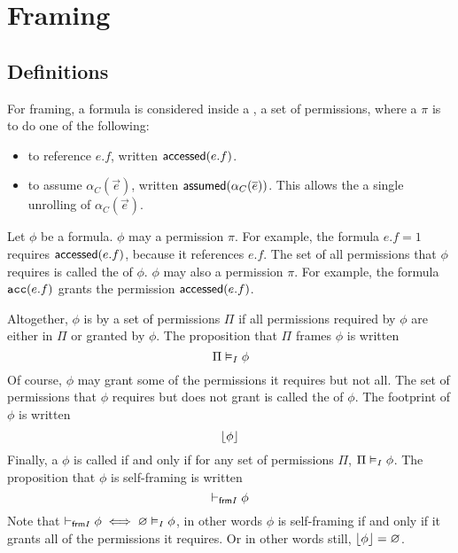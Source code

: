\newpage
\section{Framing}

\subsection{Definitions}

For framing, a formula is considered inside a , a set of permissions, where a  $\pi$ is to do one of the following:
\begin{itemize}
  \item to reference $e.f$, written $\textsf{accessed}(e.f)$.
  \item to assume $\alpha_C(\vec{e})$, written $\textsf{assumed}(\alpha_C(\overline{e}))$. This allows the a single unrolling of $\alpha_C(\vec{e})$.
\end{itemize}
%
Let $\phi$ be a formula.
$\phi$ may  a permission $\pi$. For example, the formula $e.f = 1$ requires $\textsf{accessed}(e.f)$, because it references $e.f$. The set of all permissions that $\phi$ requires is called the  of $\phi$. $\phi$ may also  a permission $\pi$. For example, the formula $\texttt{acc}(e.f)$ grants the permission $\textsf{accessed}(e.f)$.

Altogether, $\phi$ is  by a set of permissions $\Pi$ if all permissions required by $\phi$ are either in $\Pi$ or granted by $\phi$. The proposition that $\Pi$ frames $\phi$ is written
$$
  \Pi \vDash_I \phi
$$
Of course, $\phi$ may grant some of the permissions it requires but not all. The set of permissions that $\phi$ requires but does not grant is called the  of $\phi$. The footprint of $\phi$ is written
$$
  \lfloor \phi \rfloor
$$
Finally, a $\phi$ is called  if and only if for any set of permissions $\Pi$, $\Pi \vDash_I \phi$. The proposition that $\phi$ is self-framing is written
$$
  \vdash_{\textsf{frm}I} \phi
$$
Note that $\vdash_{\textsf{frm}I} \phi \iff \varnothing \vDash_I \phi$, in other words $\phi$ is self-framing if and only if it grants all of the permissions it requires. Or in other words still, $\lfloor \phi \rfloor = \varnothing$.

